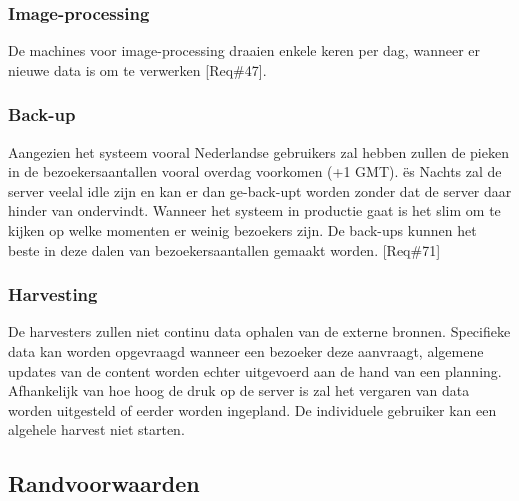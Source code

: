 \documentclass[a4paper,10pt]{article}
\begin{document}
		\subsubsection{Image-processing}
		De machines voor image-processing draaien enkele keren per dag, wanneer er nieuwe data is om te verwerken [Req\#47]. 
		
		\subsubsection{Back-up}
		Aangezien het systeem vooral Nederlandse gebruikers zal hebben zullen de pieken in de bezoekersaantallen vooral overdag voorkomen (+1 GMT). ës Nachts zal de server veelal idle zijn en kan er dan ge-back-upt worden zonder dat de server daar hinder van ondervindt. Wanneer het systeem in productie gaat is het slim om te kijken op welke momenten er weinig bezoekers zijn. De back-ups kunnen het beste in deze dalen van bezoekersaantallen gemaakt worden. [Req\#71]
		
		\subsubsection{Harvesting}
		De harvesters zullen niet continu data ophalen van de externe bronnen. Specifieke data kan worden opgevraagd wanneer een bezoeker deze aanvraagt, algemene updates van de content worden echter uitgevoerd aan de hand van een planning. Afhankelijk van hoe hoog de druk op de server is zal het vergaren van data worden uitgesteld of eerder worden ingepland. De individuele gebruiker kan een algehele harvest niet starten.
	
	\subsection{Randvoorwaarden}
\end{document}
